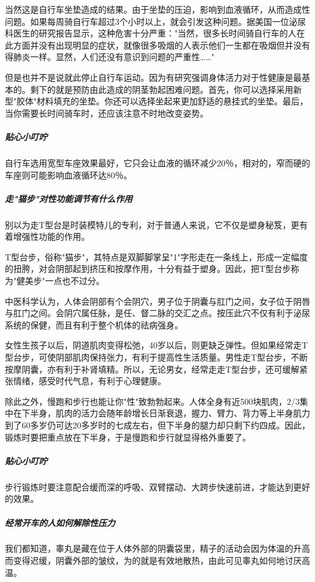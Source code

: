当然这是自行车坐垫造成的结果。由于坐垫的压迫，影响到血液循环，从而造成性问题。如果每周骑自行车超过3个小时以上，就会引发这种问题。据美国一位泌尿科医生的研究报告显示，这种危害十分严重："当然，很多长时间骑自行车的人在此方面并没有出现明显的症状，就像很多吸烟的人表示他们一生都在吸烟但并没有得肺炎一样。显然，人们还没有意识到问题的严重性……"

但是也并不是说就此停止自行车运动。因为有研究强调身体活力对于性健康是最基本的。剩下的就是预防由此造成的阴茎勃起困难问题。首先，你可以选择采用新型"胶体"材料填充的坐垫。你还可以选择坐起来更加舒适的悬挂式的坐垫。最后，当你需要长时间骑车时，还应该注意不时地改变姿势。

\subparagraph{贴心小叮咛}

自行车选用宽型车座效果最好，它只会让血液的循环减少20％，相对的，窄而硬的车座则可能影响血液循环达80％。

\subparagraph{走"猫步"对性功能调节有什么作用}

别以为走T型台是时装模特儿的专利，对于普通人来说，它不仅是塑身秘笈，更有着增强性功能的作用。

T型台步，俗称"猫步"，其特点是双脚脚掌呈"1"字形走在一条线上，形成一定幅度的扭胯，对会阴部起到挤压和按摩作用，十分有益于塑身。因此，把T型台步称为"健美步"一点也不过分。

中医科学认为，人体会阴部有个会阴穴，男子位于阴囊与肛门之间，女子位于阴唇与肛门之间。会阴穴属任脉，是任、督二脉的交汇之点。按压此穴不仅有利于泌尿系统的保健，而且有利于整个机体的祛病强身。

女性生孩子以后，阴道肌肉变得松弛，40岁以后，则更缺乏弹性。但如果经常走T型台步，可使阴部肌肉保持张力，有利于提高性生活质量。男性走T型台步，不断按摩阴囊，亦有利于补肾填精。所以，无论男女，经常走走T型台步，还可缓解紧张情绪，感受时代气息，有利于心理健康。

除此之外，慢跑和步行也能让你"性"致勃勃起来。人体全身有近500块肌肉，2/3集中在下半身，肌肉的活力会随年龄增长日渐衰退，握力、臂力、背力等上半身肌力到了60多岁仍可达20多岁时的七成左右，但下半身的腿力却只剩下约四成。因此，锻炼时要把重点放在下半身，于是慢跑和步行就显得格外重要了。

\subparagraph{贴心小叮咛}

步行锻炼时要注意配合缓而深的呼吸、双臂摆动、大跨步快速前进，才能达到更好的效果。

\subparagraph{经常开车的人如何解除性压力}

我们都知道，睾丸是藏在位于人体外部的阴囊袋里，精子的活动会因为体温的升高而变得迟缓，阴囊外部的皱纹，为的就是有效地散热，由此可见睾丸如何地讨厌高温。

